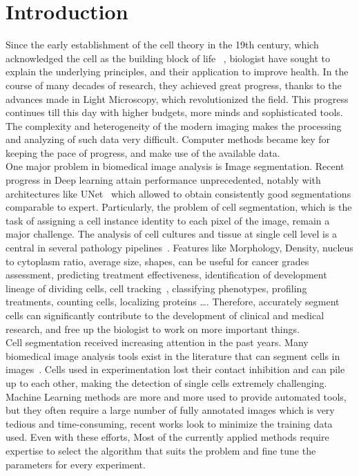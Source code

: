 \documentclass[main.tex]{subfiles}
\begin{document}
\chapter{Introduction}

Since the early establishment of the cell theory in the 19th century, which acknowledged the cell as the building block of life ~\cite{Muller-Wille2010}, biologist have sought to explain the underlying principles, and their application to improve health. In the course of many decades of research, they achieved great progress, thanks to the advances made in Light Microscopy, which revolutionized the field. This progress continues till this day with higher budgets, more minds and sophisticated tools. The complexity and heterogeneity of the modern imaging makes the processing and analyzing of such data very difficult. Computer methods became key for keeping the pace of progress, and make use of the available data.\\

One major problem in biomedical image analysis is Image segmentation. Recent progress in Deep learning attain performance unprecedented, notably with architectures like UNet~\cite{Ronneberger2015} which allowed to obtain consistently good segmentations comparable to expert. Particularly, the problem of cell segmentation, which is the task of assigning a cell instance identity to each pixel of the image, remain a major challenge. The analysis of cell cultures and tissue at single cell level is a central in several pathology pipelines~\cite{Boquet-Pujadas2021}. Features like Morphology, Density, nucleus to cytoplasm ratio, average size, shapes, can be useful for cancer grades assessment, predicting treatment effectiveness, identification of development lineage of dividing cells, cell tracking~\cite{Boquet-Pujadas2021}, classifying phenotypes, profiling treatments, counting cells, localizing proteins \dots. Therefore, accurately segment cells can significantly contribute to the development of clinical and medical research, and free up the biologist to work on more important things.\\


Cell segmentation received increasing attention in the past years. Many biomedical image analysis tools exist in the literature that can segment cells in images~\cite{Boquet-Pujadas2021}. Cells used in experimentation lost their contact inhibition and can pile up to each other, making the detection of single cells extremely challenging. Machine Learning methods are more and more used to provide automated tools, but they often require a large number of fully annotated images which is very tedious and time-consuming, recent works look to minimize the training data used. Even with these efforts, Most of the currently applied methods require expertise to select the algorithm that suits the problem and fine tune the parameters for every experiment.\\
\end{document}
